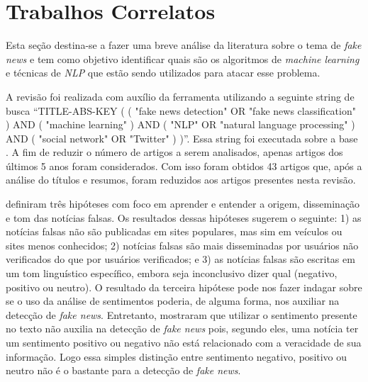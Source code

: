 \section{Trabalhos Correlatos}





Esta seção destina-se a fazer uma breve análise da literatura sobre o tema de \textit{fake news} e tem como objetivo identificar quais são os algoritmos de \textit{machine learning} e técnicas de \textit{NLP} que estão sendo utilizados para atacar esse problema.


A revisão foi realizada com auxílio da ferramenta \cite{parsifal} utilizando a seguinte string de busca ``TITLE-ABS-KEY ( ( "fake news detection"  OR  "fake news classification" )  AND  ( "machine learning" )  AND  ( "NLP"  OR  "natural language processing" )  AND  ( "social network"  OR  "Twitter" ) )''. Essa string foi executada sobre a base \cite{scopus}. A fim de reduzir o número de artigos a serem analisados, apenas artigos dos últimos 5 anos foram considerados. Com isso foram obtidos 43 artigos que, após a análise do títulos e resumos, foram reduzidos aos artigos presentes nesta revisão.

\citet{parikh2019} definiram três hipóteses com foco em aprender e entender a origem, disseminação e tom das notícias falsas. Os resultados dessas hipóteses sugerem o seguinte: 1) as notícias falsas não são publicadas em sites populares, mas sim em veículos ou sites menos conhecidos; 2) notícias falsas são mais disseminadas por usuários não verificados do que por usuários verificados; e 3) as notícias falsas são escritas em um tom linguístico específico, embora seja inconclusivo dizer qual (negativo, positivo ou neutro). 
O resultado da terceira hipótese pode nos fazer indagar sobre se o uso da análise de sentimentos poderia, de alguma forma, nos auxiliar na detecção de \textit{fake news}. 
Entretanto,  \citet{baarir2020} mostraram que utilizar o sentimento presente no texto não auxilia na detecção de \textit{fake news} pois, segundo eles, uma notícia ter um sentimento positivo ou negativo não está relacionado com a veracidade de sua informação.
Logo essa simples distinção entre sentimento negativo, positivo ou neutro não é o bastante para a detecção de \textit{fake news}.


